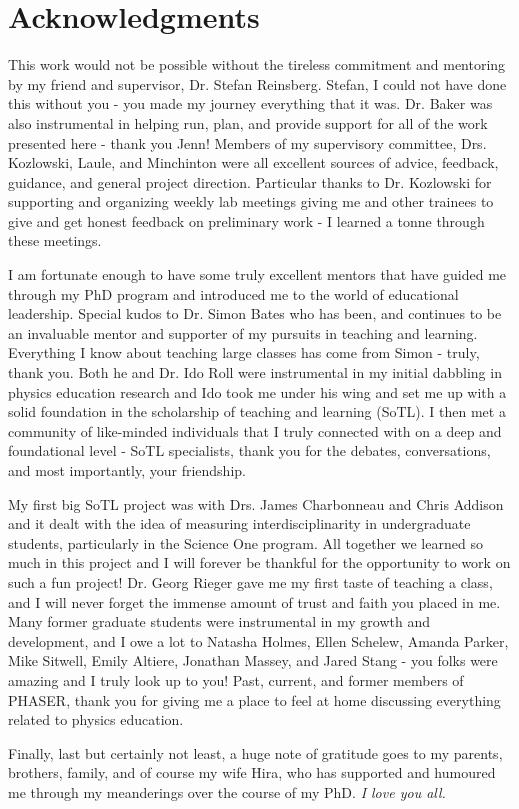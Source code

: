 
\chapter{Acknowledgments}

This work would not be possible without the tireless commitment and mentoring by my friend and supervisor, Dr. Stefan Reinsberg.
Stefan, I could not have done this without you - you made my journey everything that it was.
Dr. Baker was also instrumental in helping run, plan, and provide support for all of the work presented here - thank you Jenn! 
Members of my supervisory committee, Drs. Kozlowski, Laule, and Minchinton were all excellent sources of advice, feedback, guidance, and general project direction. 
Particular thanks to Dr. Kozlowski for supporting and organizing weekly lab meetings giving me and other trainees to give and get honest feedback on preliminary work - I learned a tonne through these meetings.

I am fortunate enough to have some truly excellent mentors that have guided me through my PhD program and introduced me to the world of educational leadership.
Special kudos to Dr. Simon Bates who has been, and continues to be an invaluable mentor and supporter of my pursuits in teaching and learning.
Everything I know about teaching large classes has come from Simon - truly, thank you.
Both he and Dr. Ido Roll were instrumental in my initial dabbling in physics education research and Ido took me under his wing and set me up with a solid foundation in the scholarship of teaching and learning (SoTL).
I then met a community of like-minded individuals that I truly connected with on a deep and foundational level - SoTL specialists, thank you for the debates, conversations, and most importantly, your friendship.

My first big SoTL project was with Drs. James Charbonneau and Chris Addison and it dealt with the idea of measuring interdisciplinarity in undergraduate students, particularly in the Science One program.
All together we learned so much in this project and I will forever be thankful for the opportunity to work on such a fun project!
Dr. Georg Rieger gave me my first taste of teaching a class, and I will never forget the immense amount of trust and faith you placed in me.
Many former graduate students were instrumental in my growth and development, and I owe a lot to Natasha Holmes, Ellen Schelew, Amanda Parker, Mike Sitwell, Emily Altiere, Jonathan Massey, and Jared Stang - you folks were amazing and I truly look up to you!
Past, current, and former members of PHASER, thank you for giving me a place to feel at home discussing everything related to physics education.

Finally, last but certainly not least, a huge note of gratitude goes to my parents, brothers, family, and of course my wife Hira, who has supported and humoured me through my meanderings over the course of my PhD. 
\emph{I love you all.}

